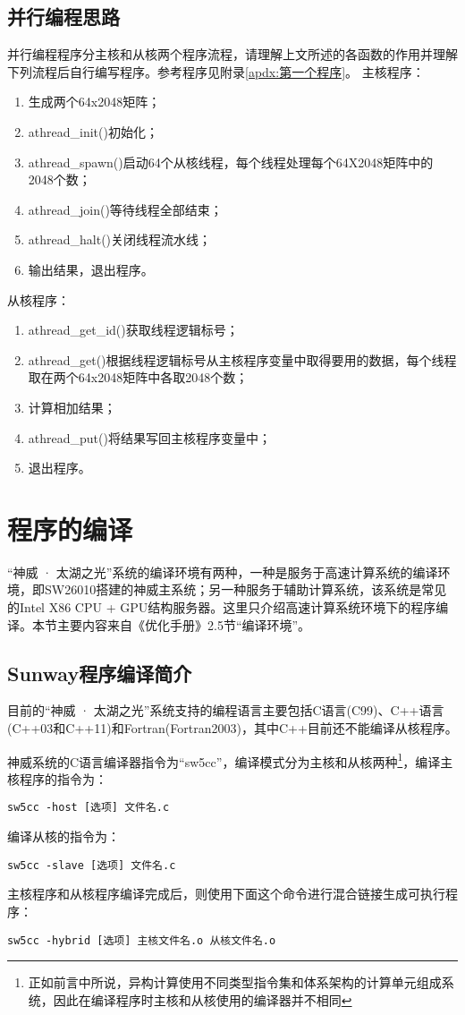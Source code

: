 \subsection{并行编程思路}\label{subsec:并行编程思路}
并行编程程序分主核和从核两个程序流程，请理解上文所述的各函数的作用并理解下列流程后自行编写程序。参考程序见附录\ref{apdx:第一个程序}。
\newline 主核程序：
\begin{enumerate}
    \item 生成两个64x2048矩阵；
    \item athread\_init()初始化；
    \item athread\_spawn()启动64个从核线程，每个线程处理每个64X2048矩阵中的2048个数；
    \item athread\_join()等待线程全部结束；
    \item athread\_halt()关闭线程流水线；
    \item 输出结果，退出程序。
\end{enumerate}
从核程序：
\begin{enumerate}
    \item athread\_get\_id()获取线程逻辑标号；
    \item athread\_get()根据线程逻辑标号从主核程序变量中取得要用的数据，每个线程取在两个64x2048矩阵中各取2048个数；
    \item 计算相加结果；
    \item athread\_put()将结果写回主核程序变量中；
    \item 退出程序。
\end{enumerate}

\section{程序的编译}
“神威 · 太湖之光”系统的编译环境有两种，一种是服务于高速计算系统的编译环境，即SW26010搭建的神威主系统；另一种服务于辅助计算系统，该系统是常见的Intel X86 CPU + GPU结构服务器。这里只介绍高速计算系统环境下的程序编译。本节主要内容来自《优化手册》2.5节“编译环境”。

\subsection{Sunway程序编译简介}
目前的“神威 · 太湖之光”系统支持的编程语言主要包括C语言(C99)、C++语言(C++03和C++11)和Fortran(Fortran2003)，其中C++目前还不能编译从核程序。

神威系统的C语言编译器指令为“sw5cc”，编译模式分为主核和从核两种\footnote{正如前言中所说，异构计算使用不同类型指令集和体系架构的计算单元组成系统，因此在编译程序时主核和从核使用的编译器并不相同}，编译主核程序的指令为：
\begin{lstlisting}
sw5cc -host [选项] 文件名.c
\end{lstlisting}
编译从核的指令为：
\begin{lstlisting}
sw5cc -slave [选项] 文件名.c
\end{lstlisting}
主核程序和从核程序编译完成后，则使用下面这个命令进行混合链接生成可执行程序：
\begin{lstlisting}
sw5cc -hybrid [选项] 主核文件名.o 从核文件名.o
\end{lstlisting}

